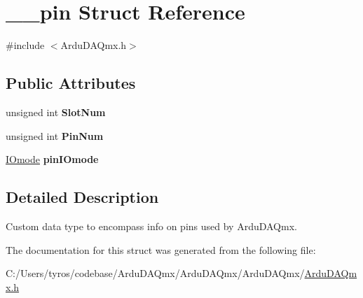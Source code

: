 \hypertarget{struct____pin}{}\section{\+\_\+\+\_\+pin Struct Reference}
\label{struct____pin}


{\ttfamily \#include $<$Ardu\+D\+A\+Qmx.\+h$>$}

\subsection*{Public Attributes}
\begin{DoxyCompactItemize}
\item 
\mbox{\label{struct____pin_a3c36e0f20da92dd489066eb97a38e2a5}} 
unsigned int {\bfseries Slot\+Num}
\item 
\mbox{\label{struct____pin_a967aa54980828f8773ae8ef2b6211191}} 
unsigned int {\bfseries Pin\+Num}
\item 
\mbox{\label{struct____pin_a176e91b827c02cc65aa5a09913d3f5e2}} 
\mbox{\hyperlink{_ardu_d_a_qmx_8h_a790de4c3ef85ab13a76427767a46c95f}{I\+Omode}} {\bfseries pin\+I\+Omode}
\end{DoxyCompactItemize}


\subsection{Detailed Description}
Custom data type to encompass info on pins used by Ardu\+D\+A\+Qmx. 

The documentation for this struct was generated from the following file\+:\begin{DoxyCompactItemize}
\item 
C\+:/\+Users/tyros/codebase/\+Ardu\+D\+A\+Qmx/\+Ardu\+D\+A\+Qmx/\+Ardu\+D\+A\+Qmx/\mbox{\hyperlink{_ardu_d_a_qmx_8h}{Ardu\+D\+A\+Qmx.\+h}}\end{DoxyCompactItemize}
